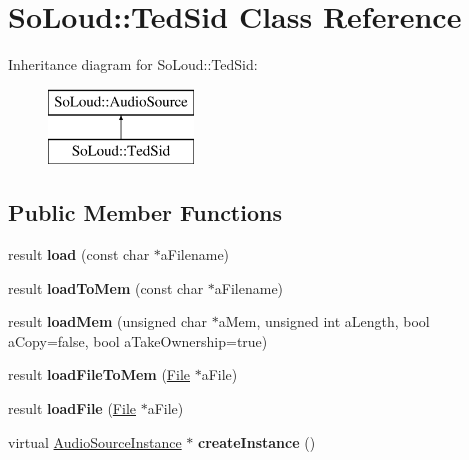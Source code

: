 \hypertarget{class_so_loud_1_1_ted_sid}{}\section{So\+Loud\+:\+:Ted\+Sid Class Reference}
\label{class_so_loud_1_1_ted_sid}
Inheritance diagram for So\+Loud\+:\+:Ted\+Sid\+:\begin{figure}[H]
\begin{center}
\leavevmode
\includegraphics[height=2.000000cm]{class_so_loud_1_1_ted_sid}
\end{center}
\end{figure}
\subsection*{Public Member Functions}
\begin{DoxyCompactItemize}
\item 
\mbox{\label{class_so_loud_1_1_ted_sid_a743a333fb6753425fd5a2924075ce218}} 
result {\bfseries load} (const char $\ast$a\+Filename)
\item 
\mbox{\label{class_so_loud_1_1_ted_sid_aef8596ef56e42fe59903dd536116d9bd}} 
result {\bfseries load\+To\+Mem} (const char $\ast$a\+Filename)
\item 
\mbox{\label{class_so_loud_1_1_ted_sid_a515322100ddced30984a7d25bb62e2c7}} 
result {\bfseries load\+Mem} (unsigned char $\ast$a\+Mem, unsigned int a\+Length, bool a\+Copy=false, bool a\+Take\+Ownership=true)
\item 
\mbox{\label{class_so_loud_1_1_ted_sid_a23705859dbe64f44224ac9b8f7648976}} 
result {\bfseries load\+File\+To\+Mem} (\mbox{\hyperlink{class_so_loud_1_1_file}{File}} $\ast$a\+File)
\item 
\mbox{\label{class_so_loud_1_1_ted_sid_a1de39e8535fedd4a799d7a8a0e5faf69}} 
result {\bfseries load\+File} (\mbox{\hyperlink{class_so_loud_1_1_file}{File}} $\ast$a\+File)
\item 
\mbox{\label{class_so_loud_1_1_ted_sid_a968529513936e68677999cc4093202b1}} 
virtual \mbox{\hyperlink{class_so_loud_1_1_audio_source_instance}{Audio\+Source\+Instance}} $\ast$ {\bfseries create\+Instance} ()
\end{DoxyCompactItemize}

